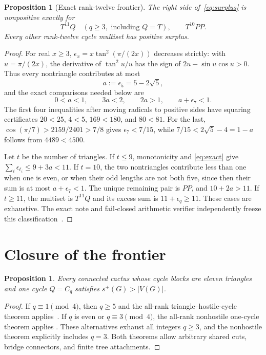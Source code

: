 \documentclass[11pt]{article}
\newtheorem{proposition}[theorem]{Proposition}
\newcommand{\splus}{s^+}
\begin{document}
\begin{proposition}[Exact rank-twelve frontier]\label{prop:frontier}
The right side of~\eqref{eq:surplus} is nonpositive exactly for
\[
 \boxed{T^{11}Q}\quad(q\geq3,\text{ including }Q=T),
 \qquad
 \boxed{T^{10}PP}.
\]
Every other rank-twelve cycle multiset has positive surplus.
\end{proposition}

\begin{proof}
For real $x\geq3$, $\epsilon_x=x\tan^2(\pi/(2x))$ decreases strictly: with
$u=\pi/(2x)$, the derivative of $\tan^2u/u$ has the sign of
$2u-\sin u\cos u>0$.  Thus every nontriangle contributes at most
\[
 a:=\epsilon_5=5-2\sqrt5,
\]
and the exact comparisons needed below are
\begin{equation}\label{eq:exact}
 0<a<1,\qquad3a<2,\qquad2a>1,
 \qquad a+\epsilon_7<1.
\end{equation}
The first four inequalities after moving radicals to positive sides have
squaring certificates $20<25$, $4<5$, $169<180$, and $80<81$.  For the last,
$\cos(\pi/7)>2159/2401>7/8$ gives $\epsilon_7<7/15$, while
$7/15<2\sqrt5-4=1-a$ follows from $4489<4500$.

Let $t$ be the number of triangles.  If $t\leq9$, monotonicity and
\eqref{eq:exact} give
$\sum_i\epsilon_{\ell_i}\leq9+3a<11$.  If $t=10$, the two nontriangles
contribute less than one when one is even, or when their odd lengths are not
both five, since then their sum is at most $a+\epsilon_7<1$.  The unique
remaining pair is $PP$, and $10+2a>11$.  If $t\geq11$, the multiset is
$T^{11}Q$ and its excess sum is $11+\epsilon_q\geq11$.  These cases are
exhaustive.  The exact note and fail-closed arithmetic verifier independently
freeze this classification~\cite{Frontier}.
\end{proof}

\section{Closure of the frontier}

\begin{proposition}\label{prop:onecycle}
Every connected cactus whose cycle blocks are eleven triangles and one cycle
$Q=C_q$ satisfies $\splus(G)>|V(G)|$.
\end{proposition}

\begin{proof}
If $q\equiv1\pmod4$, then $q\geq5$ and the all-rank
triangle--hostile-cycle theorem applies~\cite{Hostile}.  If $q$ is even or
$q\equiv3\pmod4$, the all-rank nonhostile one-cycle theorem applies
\cite{Nonhostile}.  These alternatives exhaust all integers $q\geq3$, and the
nonhostile theorem explicitly includes $q=3$.  Both theorems allow arbitrary
shared cuts, bridge connectors, and finite tree attachments.
\end{proof}
\end{document}
